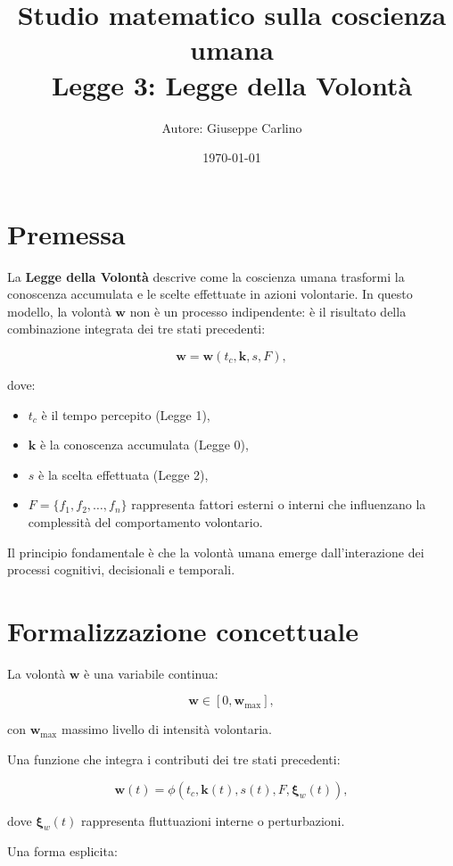 \documentclass[12pt,a4paper]{article}
\title{\centering Studio matematico sulla coscienza umana \\ Legge 3: Legge della Volontà}
\author{Autore: Giuseppe Carlino}
\date{\today}
\begin{document}
\maketitle

\section{Premessa}

La \textbf{Legge della Volontà} descrive come la coscienza umana trasformi la conoscenza accumulata e le scelte effettuate in azioni volontarie.  
In questo modello, la volontà $\bm{w}$ non è un processo indipendente: è il risultato della combinazione integrata dei tre stati precedenti:

\[
\bm{w} = \bm{w}(t_c, \bm{k}, s, F),
\]

dove:

\begin{itemize}
    \item $t_c$ è il tempo percepito (Legge 1),
    \item $\bm{k}$ è la conoscenza accumulata (Legge 0),
    \item $s$ è la scelta effettuata (Legge 2),
    \item $F = \{f_1, f_2, \dots, f_n\}$ rappresenta fattori esterni o interni che influenzano la complessità del comportamento volontario.
\end{itemize}

Il principio fondamentale è che la volontà umana emerge dall’interazione dei processi cognitivi, decisionali e temporali.

\section{Formalizzazione concettuale}

La volontà $\bm{w}$ è una variabile continua:

\[
\bm{w} \in [0, \bm{w}_{\max}],
\]

con $\bm{w}_{\max}$ massimo livello di intensità volontaria.

Una funzione che integra i contributi dei tre stati precedenti:

\begin{equation}
\bm{w}(t) = \phi(t_c, \bm{k}(t), s(t), F, \bm{\xi}_w(t)),
\end{equation}

dove $\bm{\xi}_w(t)$ rappresenta fluttuazioni interne o perturbazioni.

Una forma esplicita:
\end{document}
